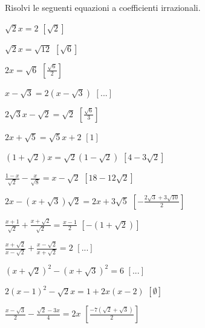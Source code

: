 \begin{esercizio}[*]
\label{ese:2.80}
Risolvi le seguenti equazioni a coefficienti irrazionali.
\begin{htmulticols}{2}
\begin{enumeratea}
\item \(\sqrt 2x=2\)
\hfill \(\left[\sqrt 2 \right]\)
\item \(\sqrt 2x=\sqrt{12}\)
\hfill \(\left[\sqrt 6\right]\)
\item \(2x=\sqrt 6\)
\hfill \(\left[\frac{\sqrt{6}}{2}\right]\)
\item \(x-\sqrt 3=2\left(x-\sqrt 3\right)\)
\hfill \(\left[...\right]\)
\item \(2\sqrt 3x-\sqrt 2=\sqrt 2\)
\hfill \(\left[\frac{\sqrt 6} 3\right]\)
\item \(2x+\sqrt 5=\sqrt 5x+2\)
\hfill \(\left[1\right]\)
\item \((1+\sqrt 2)x=\sqrt 2(1-\sqrt 2)\)
\hfill \(\left[4-3\sqrt 2\right]\)
\item \(\frac{1-x}{\sqrt 2}-\frac x{\sqrt 8}=x-\sqrt 2\)
\hfill \(\left[18-12\sqrt 2\right]\)
\item \(2x-\left(x+\sqrt 3\right)\sqrt 2=2x+3\sqrt 5\)
\hfill \(\left[-\frac{2\sqrt 3+3\sqrt{10}} 2\right]\)
\item \(\frac{x+1}{\sqrt 2}+\frac{x+\sqrt 2}{\sqrt 2}=\frac{x-1} 2\)
\hfill \(\left[-(1+\sqrt 2)\right]\)
\item \(\frac{x+\sqrt 2}{x-\sqrt 2}+\frac{x-\sqrt 2}{x+\sqrt 2}=2\)
\hfill \(\left[...\right]\)
\item \((x+\sqrt 2)^2-(x+\sqrt 3)^2=6\)
\hfill \(\left[...\right]\)
\item \(2(x-1)^2-\sqrt 2x=1+2x(x-2)\)
\hfill \(\left[\emptyset\right]\)
\item \(\frac{x-\sqrt 3} 2-\frac{\sqrt 2-3x} 4=2x\)
\hfill \(\left[\frac{-7(\sqrt 2+\sqrt 3)} 2\right]\)
\end{enumeratea}
\end{htmulticols}
\end{esercizio}


